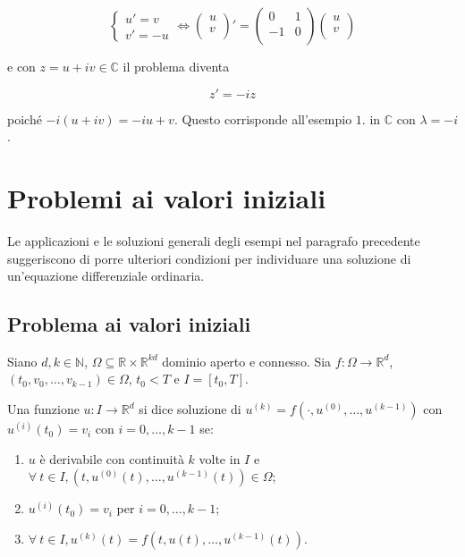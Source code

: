 \documentclass[hidelinks, 10pt]{report}
\begin{document}
\begin{enumerate}
\[
\begin{cases}
u' = v \\
v' = -u
\end{cases} \iff \begin{pmatrix}
	u \\
	v \\
\end{pmatrix} ' = \begin{pmatrix}
	 0 & 1 \\
	-1 & 0 \\
\end{pmatrix} \begin{pmatrix}
	u \\
	v \\
\end{pmatrix}
\]

e con $ z = u + iv \in \mathbb{C} $ il problema diventa

\[ z' = -i z \]

poich\'e $ -i(u + iv) = -i u + v $. Questo corrisponde all'esempio $ 1. $ in $ \mathbb{C} $ con $ \lambda = -i $.
\end{enumerate}

\section{Problemi ai valori iniziali}
Le applicazioni e le soluzioni generali degli esempi nel paragrafo precedente suggeriscono di porre ulteriori condizioni per individuare una soluzione di un'equazione differenziale ordinaria.

\subsection{Problema ai valori iniziali}
Siano $ d, k \in \mathbb{N} $, $ \Omega \subseteq \mathbb{R} \times \mathbb{R}^{kd} $ dominio aperto e connesso. Sia $ f: \Omega \to \mathbb{R}^{d} $, $ (t_{0}, v_{0}, \dotsc, v_{k-1}) \in \Omega $, $ t_{0} < T $ e $ I = [t_{0}, T] $.

Una funzione $ u: I \to \mathbb{R}^{d} $ si dice soluzione di $ u^{(k)} = f(\cdot, u^{(0)}, \dotsc, u^{(k-1)}) $ con $ u^{(i)} (t_{0}) = v_{i} $ con $ i = 0, \dotsc, k - 1 $ se:
\begin{enumerate}
\item $ u $ \`e derivabile con continuit\`a $ k $ volte in $ I $ e $ \forall\ t \in I, \left( t, u^{(0)}(t), \dotsc, u^{(k-1)}(t) \right) \in \Omega $;
\item $ u^{(i)} (t_{0}) = v_{i} $ per $ i = 0, \dotsc, k - 1 $;
\item $ \forall\ t \in I, u^{(k)}(t) = f \left( t, u(t), \dotsc, u^{(k-1)}(t) \right) $.
\end{enumerate}
\end{document}
